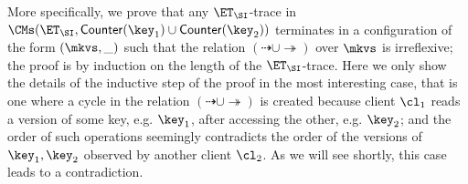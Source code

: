 {More specifically, we prove that any $\ET_{\SI}$-trace
in $\CMs(\ET_{\SI}, \mathsf{Counter}(\key_1) \cup \mathsf{Counter}(\key_2))$ terminates in a configuration of the form $(\mkvs, \_)$ 
such that the relation $(\dashrightarrow \cup \twoheadrightarrow)$ over $\mkvs$ is irreflexive; the proof is by induction on the 
length of the $\ET_{\SI}$-trace. Here we only show the details of the inductive step of the proof in the most interesting case, 
that is one where a cycle in the relation $(\dashrightarrow \cup \twoheadrightarrow)$ is created because 
client $\cl_{1}$ reads a version of some key, e.g. $\key_{1}$, after accessing the other, e.g. $\key_{2}$; and the order 
of such operations seemingly contradicts the order of the versions of $\key_{1}, \key_{2}$ observed by another client 
$\cl_{2}$. As we will see shortly, this case leads to a contradiction. 

}
